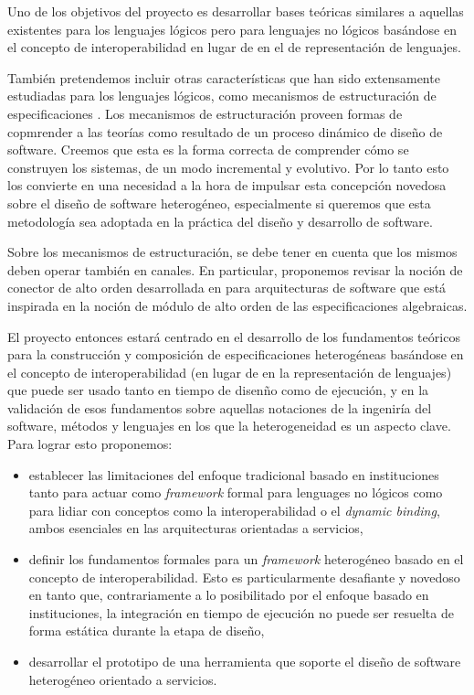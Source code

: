 \documentclass{article}
\begin{document}
  Uno de los objetivos del proyecto es desarrollar bases te\'oricas similares a aquellas existentes para los lenguajes l\'ogicos pero para lenguajes no l\'ogicos bas\'andose en el concepto de interoperabilidad en lugar de en el de representaci\'on de lenguajes.
  
  Tambi\'en pretendemos incluir otras caracter\'isticas que han sido extensamente estudiadas para los lenguajes l\'ogicos, como mecanismos de estructuraci\'on de especificaciones \cite{borzyszkowski:tcs-286_2,lopezpombo:ictac10}. Los mecanismos de estructuraci\'on proveen formas de copmrender a las teor\'ias como resultado de un proceso din\'amico de dise\~no de software. Creemos que esta es la forma correcta de comprender c\'omo se construyen los sistemas, de un modo incremental y evolutivo. Por lo tanto esto los convierte en una necesidad  a la hora de impulsar esta concepci\'on novedosa sobre el dise\~no de software heterog\'eneo, especialmente si queremos que esta metodolog\'ia sea adoptada en la pr\'actica del dise\~no y desarrollo de software.
  
  Sobre los mecanismos de estructuraci\'on, se debe tener en cuenta que los mismos deben operar tambi\'en en canales. En particular, proponemos revisar la noci\'on de conector de alto orden desarrollada en \cite{lopez+:acmtosem-12_1} para arquitecturas de software que est\'a inspirada en la noci\'on de m\'odulo de alto orden de las especificaciones algebraicas.
  
  El proyecto entonces estar\'a centrado en el desarrollo de los fundamentos te\'oricos para la construcci\'on y composici\'on de especificaciones heterog\'eneas bas\'andose en el concepto de interoperabilidad (en lugar de en la representaci\'on de lenguajes) que puede ser usado tanto en tiempo de disen\~no como de ejecuci\'on, y en la validaci\'on de esos fundamentos sobre aquellas notaciones de la ingenir\'ia del software, m\'etodos y lenguajes en los que la heterogeneidad es un aspecto clave. Para lograr esto proponemos:

  \begin{itemize}
  \item establecer las limitaciones del enfoque tradicional basado en instituciones tanto para actuar como \emph{framework} formal para lenguages no l\'ogicos como para lidiar con conceptos como la interoperabilidad o el \emph{dynamic binding}, ambos esenciales en las arquitecturas orientadas a servicios,
  
  \item definir los fundamentos formales para un \emph{framework} heterog\'eneo basado en el concepto de interoperabilidad. Esto es particularmente desafiante y novedoso en tanto que, contrariamente a lo posibilitado por el enfoque basado en instituciones, la integraci\'on en tiempo de ejecuci\'on no puede ser resuelta de forma est\'atica durante la etapa de dise\~no,
  
  \item desarrollar el prototipo de una herramienta que soporte el dise\~no de software heterog\'eneo orientado a servicios.
  \end{itemize}
\end{document}
